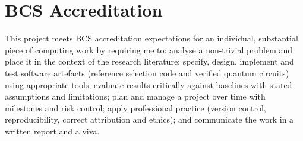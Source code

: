\documentclass[11pt,a4paper]{article}
\begin{document}
\section{BCS Accreditation}

This project meets BCS accreditation expectations for an individual, substantial piece of computing work by requiring me to: analyse a non-trivial problem and place it in the context of the research literature; specify, design, implement and test software artefacts (reference selection code and verified quantum circuits) using appropriate tools; evaluate results critically against baselines with stated assumptions and limitations; plan and manage a project over time with milestones and risk control; apply professional practice (version control, reproducibility, correct attribution and ethics); and communicate the work in a written report and a viva.
\end{document}
